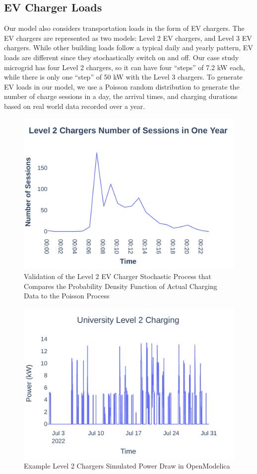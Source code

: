 \documentclass[conference]{IEEEtran}
\begin{document}
    \subsection{EV Charger Loads }
   		Our model also considers transportation loads in the form of EV chargers. The EV chargers are represented as two models: Level 2 EV chargers, and Level 3 EV chargers. While other building loads follow a typical daily and yearly pattern, EV loads are different since they stochastically switch on and off. Our case study microgrid has four Level 2 chargers, so it can have four ``steps'' of 7.2 kW each, while there is only one ``step'' of 50 kW with the Level 3 chargers. To generate EV loads in our model, we use a Poisson random distribution to generate the number of charge sessions in a day, the arrival times, and charging durations based on real world data recorded over a year. 
		\begin{figure}
			\centering
			\includegraphics[width=0.9\linewidth]{Fig/Option_3/l2_avg_day_rand_poisson_1_hour_real.pdf}
			\caption{\footnotesize Validation of the Level 2 EV Charger Stochastic Process that Compares the Probability Density Function of Actual Charging Data to the Poisson Process}
			\label{fig:l2avgdayrandpoisson1hourpdf}
		\end{figure}
		\begin{figure}
			\centering
			\includegraphics[width=0.9\linewidth]{Fig/Option_3/L2_short.pdf}
			\caption{\footnotesize Example Level 2 Chargers Simulated Power Draw in OpenModelica}
			\label{fig:l2short}
		\end{figure}
\end{document}
